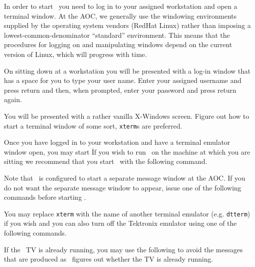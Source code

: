 
    In order to start \AIPS\, you need to log in to your assigned
workstation and open a terminal window.  At the AOC, we generally
use the windowing environments supplied by the operating system
vendors (RedHat Linux) rather than imposing a
lowest-common-denominator ``standard'' environment.  This means that
the procedures for logging on and manipulating windows depend on the
current version of Linux, which will progress with time.

    On sitting down at a workstation you will be presented with a
log-in window that has a space for you to type your user name.  Enter
your assigned username and press return and then, when prompted, enter
your password and press return again.

    You will be presented with a rather vanilla X-Windows screen.
Figure out how to start a terminal window of some sort, {\tt xterm}s
are preferred.


    Once you have logged in to your workstation and have a terminal emulator
window open, you may start \AIPS\. If you wish to run \AIPS\ on the machine
at which you are sitting we recommend that you start \AIPS\ with the following
command.

    Note that \AIPS\ is configured to start a separate message window
at the AOC.  If you do not want the separate message window to appear,
issue one of the following commands before starting \AIPS\@.

    You may replace {\tt xterm} with the name of another terminal emulator
(e.g. {\tt dtterm}) if you wish and you can also turn off the Tektronix
emulator using one of the following commands.

    If the \AIPS\ TV is already running, you may use the following to avoid
the messages that are produced as \AIPS\ figures out whether the TV is
already running.
\pd

